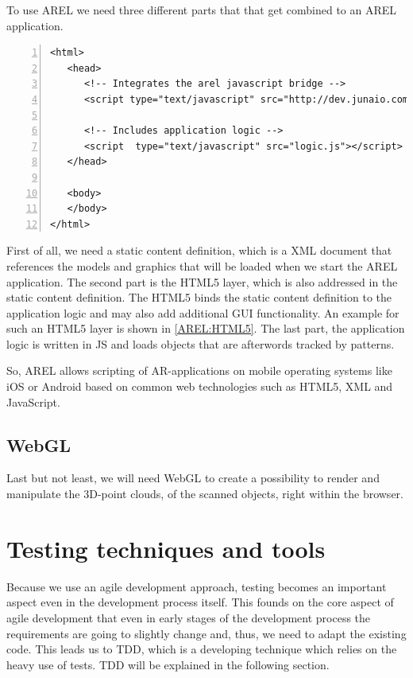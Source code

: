 To use \ac{AREL} we need three different parts that that get combined to an \ac{AREL} application.

\begin{lstlisting}[numbers=left,caption={Example for the HTML5 layer},label=AREL:HTML5,frame=tlbr,breaklines]
<html>
   <head>
      <!-- Integrates the arel javascript bridge -->
      <script type="text/javascript" src="http://dev.junaio.com/arel/js/arel.js"></script>

      <!-- Includes application logic -->
      <script  type="text/javascript" src="logic.js"></script>
   </head>
 
   <body>
   </body>
</html>
\end{lstlisting}

First of all, we need a static content definition, which is a \ac{XML} document that references the models and graphics that will be loaded when we start the \ac{AREL} application. The second part is the \ac{HTML5} layer, which is also addressed in the static content definition. The \ac{HTML5} binds the static content definition to the application logic and may also add additional \ac{GUI} functionality. An example for such an \ac{HTML5} layer is shown in \ref{AREL:HTML5}. The last part, the application logic is written in \ac{JS} and loads objects that are afterwords tracked by patterns.  

So, \ac{AREL} allows scripting of \ac{AR}-applications on mobile operating systems like iOS or Android based on common web technologies such as \ac{HTML5}, \ac{XML} and JavaScript. 

\subsection{WebGL}
Last but not least, we will need \ac{WebGL} to create a possibility to render and manipulate the 3D-point clouds, of the scanned objects, right within the browser.

\section{Testing techniques and tools}	
Because we use an agile development approach, testing becomes an important aspect even in the development process itself. This founds on the core aspect of agile development that even in early stages of the development process the requirements are going to slightly change and, thus, we need to adapt the existing code. This leads us to \ac{TDD}, which is a developing technique which relies on the heavy use of tests. \ac{TDD} will be explained in the following section. 

